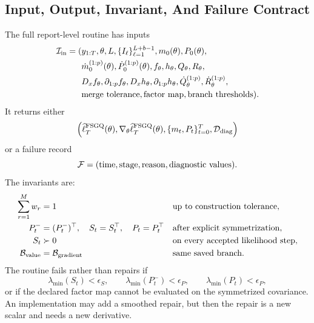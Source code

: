\documentclass[11pt]{article}
\numberwithin{equation}{section}
\newcommand{\ellhat}{\widehat\ell}
\begin{document}
\subsection{Input, Output, Invariant, And Failure Contract}
\label{subsec:p32-io-contract}

The full report-level routine has inputs
\begin{equation}
\begin{aligned}
  \mathcal I_{\rm in}
  =
  (&y_{1:T},\theta,L,\{I_\ell\}_{\ell=1}^{L+b-1},
  m_0(\theta),P_0(\theta),\\
  &\dot m_0^{(1:p)}(\theta),\dot P_0^{(1:p)}(\theta),
  f_\theta,h_\theta,Q_\theta,R_\theta,\\
  &D_xf_\theta,\partial_{1:p}f_\theta,
  D_xh_\theta,\partial_{1:p}h_\theta,
  \dot Q_\theta^{(1:p)},\dot R_\theta^{(1:p)},\\
  &\text{merge tolerance},\text{factor map},\text{branch thresholds}).
\end{aligned}
  \label{eq:p32-input-contract}
\end{equation}
It returns either
\begin{equation}
  \left(
  \ellhat_T^{\rm FSGQ}(\theta),
  \nabla_\theta\ellhat_T^{\rm FSGQ}(\theta),
  \{m_t,P_t\}_{t=0}^T,
  \mathcal D_{\rm diag}
  \right)
  \label{eq:p32-output-success}
\end{equation}
or a failure record
\begin{equation}
  \mathcal F=(\hbox{time},\hbox{stage},\hbox{reason},\hbox{diagnostic values}).
  \label{eq:p32-output-failure}
\end{equation}
The invariants are:
\begin{align}
  \sum_{r=1}^M w_r&=1
  &&\hbox{up to construction tolerance},
  \label{eq:p32-invariant-weight-sum}\\
  P_t^-&=(P_t^-)^\top,\quad
  S_t=S_t^\top,\quad
  P_t=P_t^\top
  &&\hbox{after explicit symmetrization},
  \label{eq:p32-invariant-symmetry}\\
  S_t&\succ0
  &&\hbox{on every accepted likelihood step},
  \label{eq:p32-invariant-positive-S}\\
  \mathcal B_{\rm value}&=\mathcal B_{\rm gradient}
  &&\hbox{same saved branch}.
  \label{eq:p32-invariant-same-branch}
\end{align}
The routine fails rather than repairs if
\begin{equation}
  \lambda_{\min}(S_t)<\epsilon_S,\qquad
  \lambda_{\min}(P_t^-)<\epsilon_P,\qquad
  \lambda_{\min}(P_t)<\epsilon_P,
  \label{eq:p32-failure-eigen}
\end{equation}
or if the declared factor map cannot be evaluated on the symmetrized
covariance.  An implementation may add a smoothed repair, but then the repair
is a new scalar and needs a new derivative.
\end{document}
